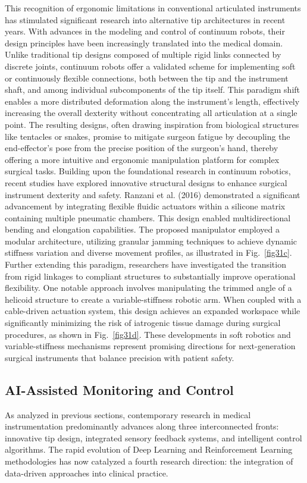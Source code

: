 This recognition of ergonomic limitations in conventional articulated instruments has stimulated significant research into alternative tip architectures in recent years. With advances in the modeling and control of continuum robots, their design principles have been increasingly translated into the medical domain. Unlike traditional tip designs composed of multiple rigid links connected by discrete joints, continuum robots offer a validated scheme for implementing soft or continuously flexible connections, both between the tip and the instrument shaft, and among individual subcomponents of the tip itself. This paradigm shift enables a more distributed deformation along the instrument's length, effectively increasing the overall dexterity without concentrating all articulation at a single point. The resulting designs, often drawing inspiration from biological structures like tentacles or snakes, promise to mitigate surgeon fatigue by decoupling the end-effector's pose from the precise position of the surgeon's hand, thereby offering a more intuitive and ergonomic manipulation platform for complex surgical tasks.
Building upon the foundational research in continuum robotics, recent studies have explored innovative structural designs to enhance surgical instrument dexterity and safety. Ranzani et al. (2016) demonstrated a significant advancement by integrating flexible fluidic actuators within a silicone matrix containing multiple pneumatic chambers. This design enabled multidirectional bending and elongation capabilities. The proposed manipulator employed a modular architecture, utilizing granular jamming techniques to achieve dynamic stiffness variation and diverse movement profiles, as illustrated in Fig.~\ref{fig31c}.
Further extending this paradigm, researchers have investigated the transition from rigid linkages to compliant structures to substantially improve operational flexibility. One notable approach involves manipulating the trimmed angle of a helicoid structure to create a variable-stiffness robotic arm\cite{guan_trimmed_2023}. When coupled with a cable-driven actuation system, this design achieves an expanded workspace while significantly minimizing the risk of iatrogenic tissue damage during surgical procedures, as shown in Fig.~\ref{fig31d}. These developments in soft robotics and variable-stiffness mechanisms represent promising directions for next-generation surgical instruments that balance precision with patient safety.

\subsection{AI-Assisted Monitoring and Control}
As analyzed in previous sections, contemporary research in medical instrumentation predominantly advances along three interconnected fronts: innovative tip design, integrated sensory feedback systems, and intelligent control algorithms. The rapid evolution of Deep Learning and Reinforcement Learning methodologies has now catalyzed a fourth research direction: the integration of data-driven approaches into clinical practice.

